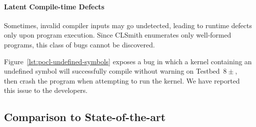 \paragraph{Latent Compile-time Defects} Sometimes, invalid compiler inputs may go undetected, leading to runtime defects only upon program execution. Since CLSmith enumerates only well-formed  programs, this class of bugs cannot be discovered.

Figure~\ref{lst:pocl-undefined-symbols} exposes a bug in which a kernel containing an undefined symbol will successfully compile without warning on Testbed~$8\pm$, then crash the program when attempting to run the kernel. We have reported this issue to the developers.

%
%
%
%
%


\subsection{Comparison to State-of-the-art}%
\label{subsec:vs_clsmith}

